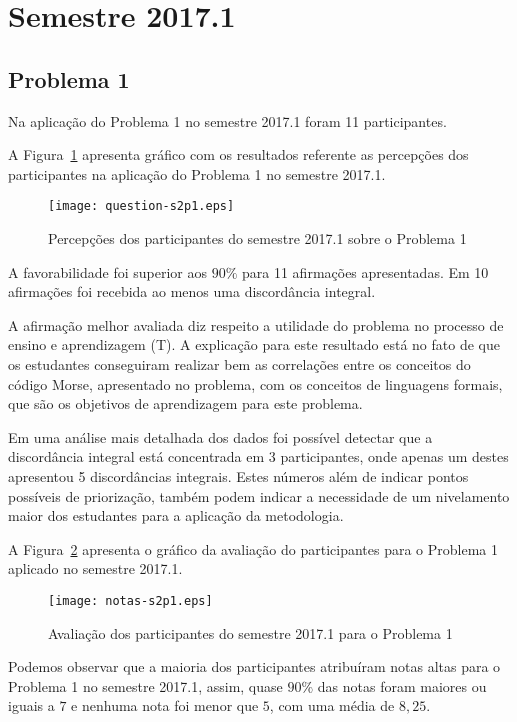 \section{Semestre 2017.1}
\label{sec-sem-2017}

\subsection{Problema 1}
\label{sec-2017-p1}
Na aplicação do Problema 1 no semestre 2017.1 foram 11 participantes.

A Figura~\ref{percep-s2p1} apresenta gráfico com os resultados referente
as percepções dos participantes na aplicação do
Problema 1 no semestre 2017.1.

\begin{figure}[!htb]
\centering
\texttt{[image: question-s2p1.eps]}
\caption{Percepções dos participantes do semestre 2017.1 sobre o Problema 1}
\label{percep-s2p1}
\end{figure}

A favorabilidade foi superior aos $90\%$ para 11 afirmações apresentadas.
Em 10 afirmações foi recebida ao menos uma discordância integral.

A afirmação melhor avaliada diz respeito a utilidade do problema no
processo de ensino e aprendizagem (T).
A explicação para este resultado está no fato de que os estudantes
conseguiram realizar bem as correlações entre os conceitos
do código Morse, apresentado no problema, com os conceitos de
linguagens formais, que são os objetivos de aprendizagem para
este problema.

Em uma análise mais detalhada dos dados foi possível
detectar que a discordância integral está concentrada
em 3 participantes, onde apenas um destes apresentou
5 discordâncias integrais.
Estes números além de indicar pontos possíveis de
priorização, também podem indicar a necessidade
de um nivelamento maior dos estudantes para a aplicação
da metodologia.

A Figura~\ref{aval-s2p1} apresenta o gráfico da
avaliação do participantes para o Problema 1 aplicado no semestre 2017.1.

\begin{figure}[!htb]
\centering
\texttt{[image: notas-s2p1.eps]}
\caption{Avaliação dos participantes do semestre 2017.1 para o Problema 1}
\label{aval-s2p1}
\end{figure}

Podemos observar que a maioria dos participantes atribuíram
notas altas para o Problema 1 no semestre 2017.1, assim, quase $90\%$ das notas
foram maiores ou iguais a $7$ e nenhuma nota foi menor que $5$, com uma média
de $8,25$.

